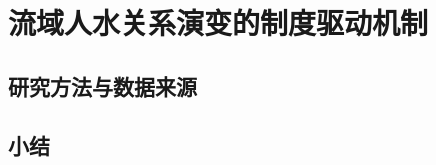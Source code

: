 \chapter{流域人水关系演变的制度驱动机制}\label{cha:5}


\section{研究方法与数据来源}\label{ch5:methods}






\section{小结}\label{ch5:summary}

